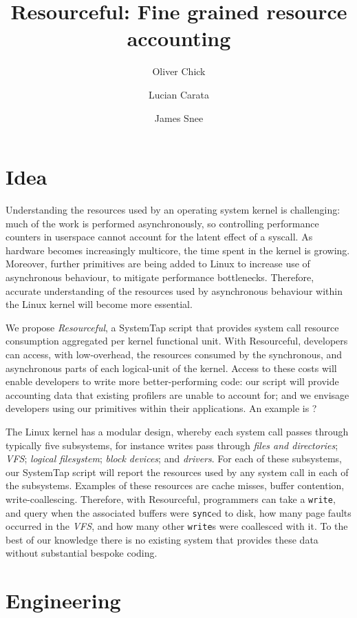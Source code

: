 \documentclass{article}
\title{Resourceful: Fine grained resource accounting}
\author{Oliver Chick \and Lucian Carata \and James Snee}
\begin{document}
\maketitle{}



\section{Idea}

Understanding the resources used by an operating system kernel is challenging: much of the work is performed asynchronously, so controlling performance counters in userspace cannot account for the latent effect of a syscall.
As hardware becomes increasingly multicore, the time spent in the kernel is growing.
Moreover, further primitives are being added to Linux to increase use of asynchronous behaviour, to mitigate performance bottlenecks.
Therefore, accurate understanding of the resources used by asynchronous behaviour within the Linux kernel will become more essential.

We propose \emph{Resourceful}, a SystemTap script that provides system call resource consumption aggregated per kernel functional unit.
With Resourceful, developers can access, with low-overhead, the resources consumed by the synchronous, and asynchronous parts of each logical-unit of the kernel.
Access to these costs will enable developers to write more better-performing code: our script will provide accounting data that existing profilers are unable to account for; and we envisage developers using our primitives within their applications.
An example is ?

The Linux kernel has  a modular design, whereby each system call passes through typically five subsystems, for instance writes pass through \emph{files and directories}; \emph{VFS}; \emph{logical filesystem}; \emph{block devices}; and \emph{drivers}.
For each of these subsystems, our SystemTap script will report the resources used by any system call in each of the subsystems.
Examples of these resources are cache misses, buffer contention, write-coallescing.
Therefore, with Resourceful, programmers can take a \texttt{write}, and query when the associated buffers were \texttt{sync}ed to disk, how many page faults occurred in the \emph{VFS}, and how many other \texttt{write}s were coallesced with it.
To the best of our knowledge there is no existing system that provides these data without substantial bespoke coding.

\section{Engineering}
\end{document}
